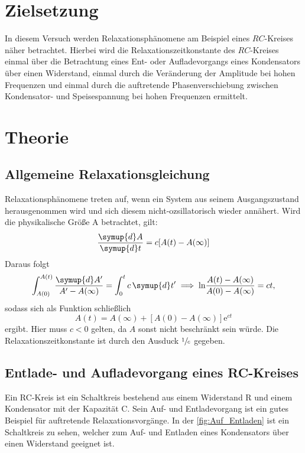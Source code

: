 \section{Zielsetzung}

In diesem Versuch werden Relaxationsphänomene am Beispiel eines $RC$-Kreises näher betrachtet. Hierbei wird die Relaxationszeitkonstante des $RC$-Kreises einmal
über die Betrachtung eines Ent- oder Aufladevorgangs eines Kondensators über einen Widerstand, einmal durch die Veränderung der Amplitude bei hohen Frequenzen 
und einmal durch die auftretende Phasenverschiebung zwischen Kondensator- und Speisespannung bei hohen Frequenzen ermittelt.
\section{Theorie}
\label{sec:Theorie}

\subsection{Allgemeine Relaxationsgleichung}

    Relaxationsphänomene treten auf, wenn ein System aus seinem Ausgangszustand herausgenommen wird und sich diesem nicht-ozsillatorisch wieder annähert.
    Wird die physikalische Größe A betrachtet, gilt:
    \begin{equation} \label{eq:relaxation}
        \frac{\symup{d}A}{\symup{d}t}=c[A(t)-A(\infty)]
    \end{equation}
    Daraus folgt 
    \begin{equation*}
        \int_{A(0)}^{A(t)} \frac{\symup{d}A'}{A' - A(\infty)} = \int_0^t c \,\symup{d}t' \implies \text{ln} \frac{A(t) - A(\infty)}{A(0) - A(\infty)} = ct,
    \end{equation*}
    sodass sich als Funktion schließlich
    \begin{equation*}
        A(t) = A(\infty) + [A(0) - A(\infty)] \text{e}^{ct}
    \end{equation*}
    ergibt. Hier muss $c<0$ gelten, da $A$ sonst nicht beschränkt sein würde. Die Relaxationszeitkonstante ist durch den Ausduck $\sfrac{1}{c}$ gegeben.


\subsection{Entlade- und Aufladevorgang eines RC-Kreises}

    Ein RC-Kreis ist ein Schaltkreis bestehend aus einem Widerstand R und einem Kondensator mit der Kapazität C. Sein Auf- und Entladevorgang ist ein gutes Beispiel 
    für auftretende Relaxationsvorgänge. In der \autoref{fig:Auf_Entladen} ist ein Schaltkreis zu sehen, welcher zum Auf- und Entladen eines Kondensators über einen 
    Widerstand geeignet ist.

